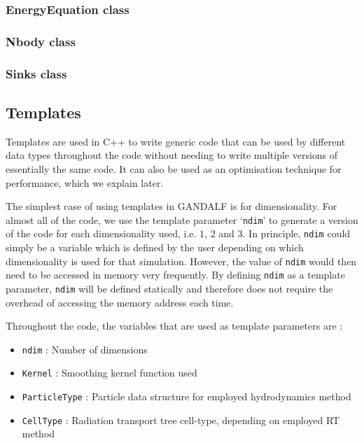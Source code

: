 \documentclass[a4paper]{article}
\newcommand{\var}[1]{\texttt{#1}}
\begin{document}
\subsubsection{EnergyEquation class}

\subsubsection{Nbody class}

\subsubsection{Sinks class}



\subsection{Templates}
Templates are used in C++ to write generic code that can be used by different data types throughout the code without needing to write multiple versions of essentially the same code.  It can also be used as an optimisation technique for performance, which we explain later.

The simplest case of using templates in GANDALF is for dimensionality.  For almost all of the code, we use the template parameter `\var{ndim}' to generate a version of the code for each dimensionality used, i.e. $1$, $2$ and $3$.  In principle, \var{ndim} could simply be a variable which is defined by the user depending on which dimensionality is used for that simulation.  However, the value of \var{ndim} would then need to be accessed in memory very frequently.  By defining \var{ndim} as a template parameter, \var{ndim} will be defined statically and therefore does not require the overhead of accessing the memory address each time.

Throughout the code, the variables that are used as template parameters are :
\begin{itemize}
\item \var{ndim} : Number of dimensions
\item \var{Kernel} : Smoothing kernel function used
\item \var{ParticleType} : Particle data structure for employed hydrodynamics method
\item \var{CellType} : Radiation transport tree cell-type, depending on employed RT method
\end{itemize}
\end{document}
